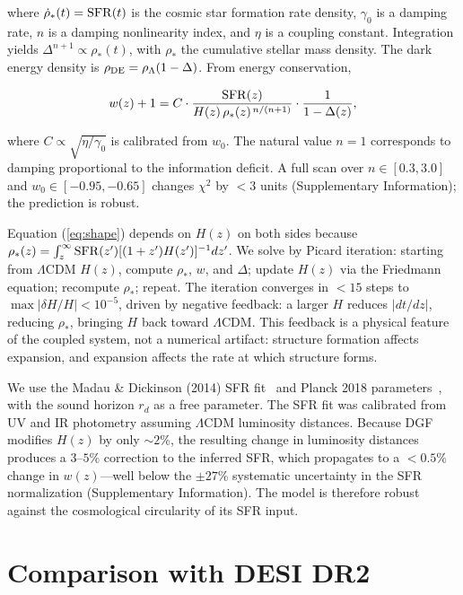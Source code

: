 \documentclass[12pt,a4paper]{article}
\begin{document}
where $\dot{\rho}_*(t)={\rm SFR}(t)$ is the cosmic star formation rate density, $\gamma_0$ is a damping rate, $n$ is a damping nonlinearity index, and $\eta$ is a coupling constant. Integration yields $\Delta^{n+1}\propto\rho_*(t)$, with $\rho_*$ the cumulative stellar mass density. The dark energy density is $\rho_{\rm DE}=\rho_\Lambda(1-\Delta)$. From energy conservation,

\begin{equation}\label{eq:shape}
w(z)+1 = C\cdot\frac{{\rm SFR}(z)}{H(z)\,\rho_*(z)^{\,n/(n+1)}}\cdot\frac{1}{1-\Delta(z)},
\end{equation}

where $C\propto\sqrt{\eta/\gamma_0}$ is calibrated from $w_0$. The natural value $n=1$ corresponds to damping proportional to the information deficit. A full scan over $n\in[0.3,3.0]$ and $w_0\in[-0.95,-0.65]$ changes $\chi^2$ by $<3$ units (Supplementary Information); the prediction is robust.

Equation (\ref{eq:shape}) depends on $H(z)$ on both sides because $\rho_*(z)=\int_z^\infty{\rm SFR}(z')[(1+z')H(z')]^{-1}dz'$. We solve by Picard iteration: starting from $\Lambda$CDM $H(z)$, compute $\rho_*$, $w$, and $\Delta$; update $H(z)$ via the Friedmann equation; recompute $\rho_*$; repeat. The iteration converges in $<15$ steps to $\max|\delta H/H|<10^{-5}$, driven by negative feedback: a larger $H$ reduces $|dt/dz|$, reducing $\rho_*$, bringing $H$ back toward $\Lambda$CDM. This feedback is a physical feature of the coupled system, not a numerical artifact: structure formation affects expansion, and expansion affects the rate at which structure forms.

We use the Madau \& Dickinson (2014) SFR fit~\cite{madau2014} and Planck 2018 parameters~\cite{planck2018}, with the sound horizon $r_d$ as a free parameter. The SFR fit was calibrated from UV and IR photometry assuming $\Lambda$CDM luminosity distances. Because DGF modifies $H(z)$ by only $\sim2\%$, the resulting change in luminosity distances produces a $3$--$5\%$ correction to the inferred SFR, which propagates to a $<0.5\%$ change in $w(z)$---well below the $\pm27\%$ systematic uncertainty in the SFR normalization (Supplementary Information). The model is therefore robust against the cosmological circularity of its SFR input.

\section*{Comparison with DESI DR2}
\end{document}
